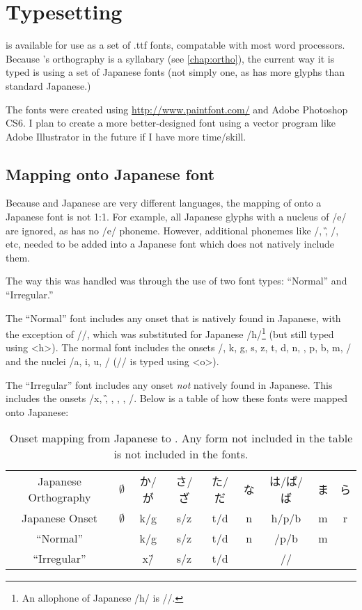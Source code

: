 \chapter{Typesetting \kurango}
\label{chap:typeset}

{\kurango} is available for use as a set of .ttf fonts, compatable with most word processors. Because {\kurango}'s orthography is a syllabary (see \autoref{chap:ortho}), the current way it is typed is using a set of Japanese fonts (not simply one, as {\kurango} has more glyphs than standard Japanese.)

The fonts were created using \url{http://www.paintfont.com/} and Adobe Photoshop CS6. I plan to create a more better-designed font using a vector program like Adobe Illustrator in the future if I have more time/skill.

\section{Mapping onto Japanese font}
	Because {\kurango} and Japanese are very different languages, the mapping of {\kurango} onto a Japanese font is not 1:1. For example, all Japanese glyphs with a nucleus of /e/ are ignored, as {\kurango} has no /e/ phoneme. However, additional phonemes like /\N, \G, \B/, etc, needed to be added into a Japanese font which does not natively include them. 

	The way this was handled was through the use of two font types: ``Normal'' and ``Irregular.'' 

	The ``Normal'' font includes any onset that is natively found in Japanese, with the exception of /\F/, which was substituted for Japanese /h/\footnote{An allophone of Japanese /h/ is /\F/.} (but still typed using <h>). The normal font includes the onsets /\glot, k, g, s, z, t, d, n, \F, p, b, m, \R/ and the nuclei /a, i, u, \OO/ (/\OO/ is typed using <o>).

	The ``Irregular'' font includes any onset \emph{not} natively found in Japanese. This includes the onsets /x, \G, \N, \W, \B, \M/. Below is a table of how these fonts were mapped onto Japanese:
		\begin{CJK}{UTF8}{min}
		\begin{table}[H]
		\centering
		\caption{Onset mapping from Japanese to \kurango. Any form not included in the table is not included in the fonts.}
		\label{irregular_font}
			\begin{tabular}{c|cccccccc}\hline\hline
				Japanese Orthography & $\emptyset$ & か/が & さ/ざ & た/だ & な & は/ぱ/ば & ま & ら \\
				Japanese Onset & $\emptyset$ & k/g & s/z & t/d & n & h/p/b & m & r \\ \hline
				{\kurango} ``Normal'' & \glot & k/g & s/z & t/d & n & \F/p/b & m & \R \\
				{\kurango} ``Irregular'' & \glot & x/\G & s/z & t/d & \N & \F/\W/\B & \W & \R \\ \hline\hline
			\end{tabular}
		\end{table}
		\end{CJK}

